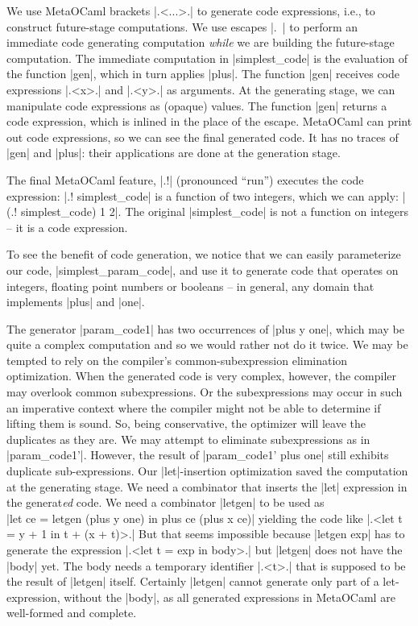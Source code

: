 \documentclass{llncs}
\begin{document}
We use MetaOCaml brackets |.<...>.| to generate code expressions,
i.e., to construct future-stage computations. We use escapes |.~| to
perform an immediate code generating computation \emph{while} we are
building the future-stage computation. The immediate computation in
|simplest_code| is the evaluation of the function |gen|, which in turn
applies |plus|. The function |gen| receives code expressions |.<x>.|
and |.<y>.| as arguments. At the generating stage, we can manipulate
code expressions as (opaque) values. The function |gen| returns a code
expression, which is inlined in the place of the escape. MetaOCaml can
print out code expressions, so we can see the final generated code. It
has no traces of |gen| and |plus|: their applications are done at the
generation stage.

The final MetaOCaml feature, |.!| (pronounced ``run'') 
executes the code expression: |.! simplest_code| is a function of two
integers, which we can apply: |(.! simplest_code) 1 2|. The original
|simplest_code| is not a function on integers -- it is a code
expression.

To see the benefit of code generation, we notice that we can easily
parameterize our code, |simplest_param_code|, and use it to generate
code that operates on integers, floating point numbers or booleans --
in general, any domain that implements |plus| and |one|.

The generator |param_code1| has two occurrences of |plus y one|,
which may be quite a complex computation and so we would rather not do
it twice. We may be tempted to rely on the compiler's
common-subexpression elimination optimization. When the generated code is
very complex, however, the compiler may overlook common subexpressions.  Or the
subexpressions may occur in such an imperative context where the compiler
might not be able to determine if lifting them is sound. So, being
conservative, the optimizer will leave the duplicates as they are. We
may attempt to eliminate subexpressions as in |param_code1'|. However,
the result of |param_code1' plus one| still exhibits duplicate
sub-expressions.  Our |let|-insertion optimization saved the
computation at the generating stage.  We need a combinator that
inserts the |let| expression in the generat\emph{ed} code. We need a
combinator |letgen| to be used as\\
|let ce = letgen (plus y one) in plus ce (plus x ce)|
yielding the code like |.<let t = y + 1 in t + (x + t)>.| 
But that seems impossible because |letgen exp| has to generate
the expression |.<let t = exp in body>.| but |letgen| does not
have the |body| yet. The body needs a temporary identifier |.<t>.|
that is supposed to be the result of |letgen| itself.  Certainly
|letgen| cannot generate only part of a let-expression, without the
|body|, as all generated expressions in MetaOCaml are well-formed and
complete.
\end{document}
